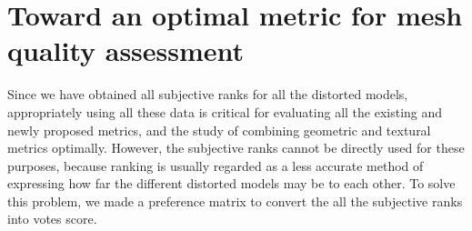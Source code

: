 \section{Toward an optimal metric for mesh quality assessment}
Since we have obtained all subjective ranks for all the distorted models, appropriately using all these data is critical for evaluating all the existing and newly proposed metrics, and the study of combining geometric and textural metrics optimally. However, the subjective ranks cannot be directly used for these purposes, because ranking is usually regarded as a less accurate method of expressing how far the different distorted models may be to each other.  To solve this problem, we made a preference matrix  to convert the all the subjective ranks into votes score.